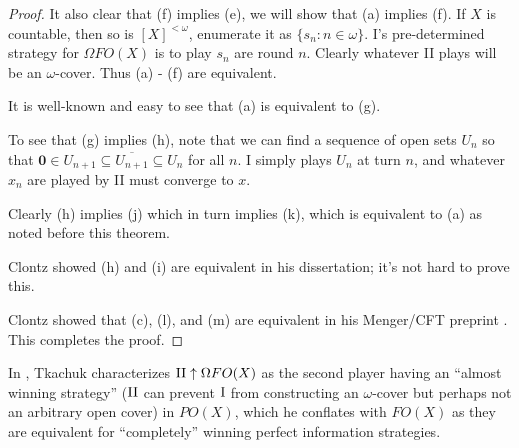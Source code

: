 \documentclass{amsart}
\theoremstyle{plain}
\theoremstyle{definition}
\theoremstyle{remark}
\theoremstyle{plain}
\theoremstyle{definition}
\theoremstyle{remark}
\begin{document}
\begin{proof}
 It also clear that (f) implies (e), we will show that (a) implies (f).
 If \(X\) is countable, then so is \([X]^{<\omega}\), enumerate it as \(\{s_n : n \in \omega\}\).
 I's pre-determined strategy for \(\Omega FO(X)\) is to play \(s_n\) are round \(n\).
 Clearly whatever II plays will be an \(\omega\)-cover.
 Thus (a) - (f) are equivalent.

 It is well-known and easy to see that (a) is equivalent to (g).

 To see that (g) implies (h), note that we can find a sequence of open sets \(U_n\) so that \(\mathbf 0 \in U_{n+1} \subseteq \overline{U_{n+1}} \subseteq U_n\) for all \(n\).
 I simply plays \(U_n\) at turn \(n\), and whatever \(x_n\) are played by II must converge to \(x\).

 Clearly (h) implies (j) which in turn implies (k), which is equivalent to (a) as noted before this theorem.

 Clontz showed (h) and (i) are equivalent in his dissertation; it's not hard to prove this.

 Clontz showed that (c), (l), and (m) are equivalent in his Menger/CFT preprint \cite{Clontz1}.
 This completes the proof.

\end{proof}

In \cite{Tkachuk3}, Tkachuk characterizes \(\mathrm{II}\uparrow\Omega FO(X)\) as the second player having an ``almost winning strategy'' (\(\mathrm{II}\) can prevent \(\mathrm{I}\) from constructing an \(\omega\)-cover but perhaps not an arbitrary open cover) in \(PO(X)\), which he conflates with \(FO(X)\) as they are equivalent for ``completely'' winning perfect information strategies. 
\end{document}
